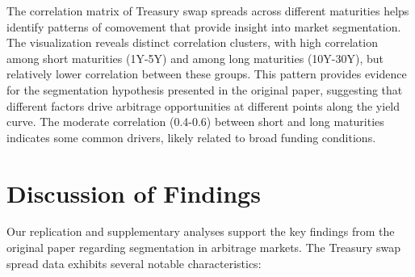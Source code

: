 \documentclass[12pt]{article}
\begin{document}


The correlation matrix of Treasury swap spreads across different maturities helps identify patterns of comovement that provide insight into market segmentation. The visualization reveals distinct correlation clusters, with high correlation among short maturities (1Y-5Y) and among long maturities (10Y-30Y), but relatively lower correlation between these groups. This pattern provides evidence for the segmentation hypothesis presented in the original paper, suggesting that different factors drive arbitrage opportunities at different points along the yield curve. The moderate correlation (0.4-0.6) between short and long maturities indicates some common drivers, likely related to broad funding conditions.

\section{Discussion of Findings}

Our replication and supplementary analyses support the key findings from the original paper regarding segmentation in arbitrage markets. The Treasury swap spread data exhibits several notable characteristics:
\end{document}
